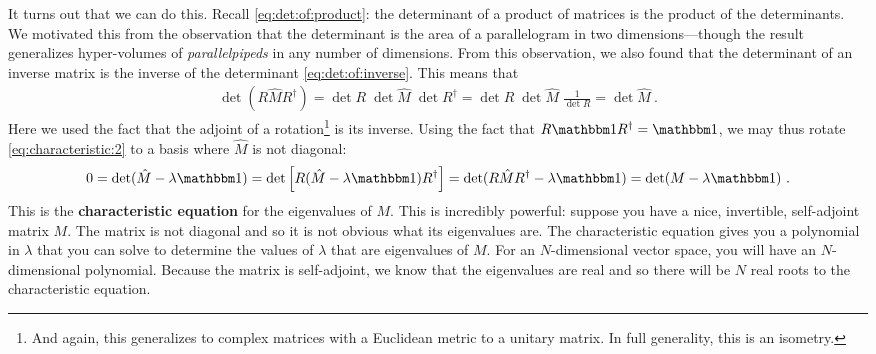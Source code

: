 \documentclass[12pt, oneside]{report}    %
\begin{document}
It turns out that we can do this. Recall \eqref{eq:det:of:product}: the determinant of a product of matrices is the product of the determinants. We motivated this from the observation that the determinant is the area of a parallelogram in two dimensions---though the result generalizes hyper-volumes of \emph{parallelpipeds} in any number of dimensions. From this observation, we also found that the determinant of an inverse matrix is the inverse of the determinant \eqref{eq:det:of:inverse}. This means that
\begin{align}
    \det(R\hat M R^\dag) = 
    \det R \; \det \hat M \; \det R^\dag
    =
    \det R \; \det \hat M \; \frac{1}{\det R}
    =
    \det \hat M \ .
\end{align}
Here we used the fact that the adjoint of a rotation\footnote{And again, this generalizes to complex matrices with a Euclidean metric to a unitary matrix. In full generality, this is an isometry.} is its inverse. Using the fact that $R\one R^\dag = \one$, we may thus rotate \eqref{eq:characteristic:2} to a basis where $\hat M$ is not diagonal:
\begin{align}
     0=\det(\hat M - \lambda \one) 
     = \det\left[R(\hat M - \lambda \one)R^\dag\right]
     = \det(R\hat M R^\dag - \lambda \one) 
     = \det(M - \lambda \one) 
     \label{eq:characteristic:equation} \ .
\end{align}
This is the \textbf{characteristic equation} for the eigenvalues of $M$. This is incredibly powerful: suppose you have a nice, invertible, self-adjoint matrix $M$. The matrix is not diagonal and so it is not obvious what its eigenvalues are. The characteristic equation gives you a polynomial in $\lambda$ that you can solve to determine the values of $\lambda$ that are eigenvalues of $M$. For an $N$-dimensional vector space, you will have an $N$-dimensional polynomial. Because the matrix is self-adjoint, we know that the eigenvalues are real and so there will be $N$ real roots to the characteristic equation.
\end{document}
